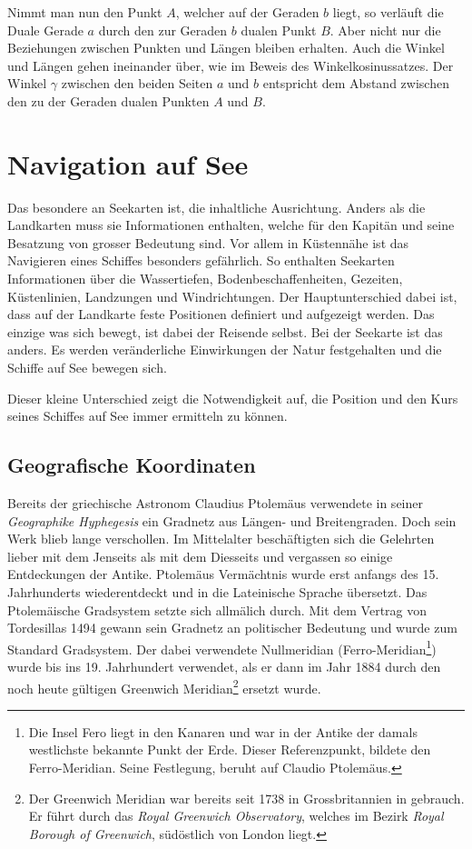 \begin{refsection}
Nimmt man nun den Punkt $A$, welcher auf der Geraden $b$ liegt, so verläuft die Duale Gerade $a$ durch den zur Geraden $b$ dualen Punkt $B$. 
Aber nicht nur die Beziehungen zwischen Punkten und Längen bleiben erhalten. Auch die Winkel und Längen gehen ineinander über, wie im Beweis des Winkelkosinussatzes.
Der Winkel $\gamma$ zwischen den beiden Seiten $a$ und $b$ entspricht dem Abstand zwischen den zu der Geraden dualen Punkten $A$ und $B$.



\section{Navigation auf See}
Das besondere an Seekarten ist, die inhaltliche Ausrichtung. Anders als die Landkarten muss sie Informationen enthalten, welche für den Kapitän und seine Besatzung von grosser Bedeutung sind. Vor allem in Küstennähe ist das Navigieren eines Schiffes besonders gefährlich. So enthalten Seekarten Informationen über die Wassertiefen, Bodenbeschaffenheiten, Gezeiten, Küstenlinien, Landzungen und Windrichtungen.
Der Hauptunterschied dabei ist, dass auf der Landkarte feste Positionen definiert und aufgezeigt werden. Das einzige was sich bewegt, ist dabei der Reisende selbst. Bei der Seekarte ist das anders. Es werden veränderliche Einwirkungen der Natur festgehalten und die Schiffe auf See bewegen sich.

Dieser kleine Unterschied zeigt die Notwendigkeit auf, die Position und den Kurs seines Schiffes auf See immer ermitteln zu können.


\subsection{Geografische Koordinaten}
Bereits der griechische Astronom Claudius Ptolemäus verwendete in seiner \textit{Geographike Hyphegesis} ein Gradnetz aus Längen- und Breitengraden. Doch sein Werk  blieb lange verschollen. Im Mittelalter beschäftigten sich die Gelehrten lieber mit dem Jenseits als mit dem Diesseits und vergassen so einige Entdeckungen der Antike.
Ptolemäus Vermächtnis wurde erst anfangs des 15. Jahrhunderts wiederentdeckt und in die Lateinische Sprache übersetzt. Das Ptolemäische Gradsystem setzte sich allmälich durch.
Mit dem Vertrag von Tordesillas 1494 gewann sein Gradnetz an politischer Bedeutung und wurde zum Standard Gradsystem. Der dabei verwendete Nullmeridian (Ferro-Meridian\footnote{%
Die Insel Fero liegt in den Kanaren und war in der Antike der damals westlichste bekannte Punkt der Erde. Dieser Referenzpunkt, bildete den Ferro-Meridian. Seine Festlegung, beruht auf Claudio Ptolemäus.}) wurde bis ins 19. Jahrhundert verwendet, als er dann im Jahr 1884 durch den noch heute gültigen Greenwich Meridian\footnote{%
Der Greenwich Meridian war bereits seit 1738 in Grossbritannien in gebrauch. Er führt durch das \textit{Royal Greenwich Observatory}, welches im Bezirk \textit{Royal Borough of Greenwich}, südöstlich von London liegt.}
ersetzt wurde.


\end{refsection}
